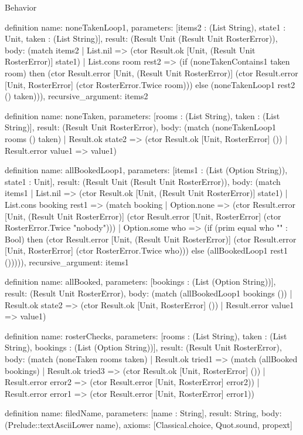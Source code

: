 \begin{lexlean}{Behavior}
\begin{semanticmodule}
definition{
  name: noneTakenLoop1,
  parameters: [items2 : (List String), state1 : Unit, taken : (List String)],
  result: (Result Unit (Result Unit RosterError)),
  body: (match items2
    | List.nil => (ctor Result.ok [Unit, (Result Unit RosterError)] state1)
    | List.cons room rest2 => (if (noneTakenContains1 taken room) then (ctor Result.error [Unit, (Result Unit RosterError)] (ctor Result.error [Unit, RosterError] (ctor RosterError.Twice room))) else (noneTakenLoop1 rest2 () taken))),
  recursive_argument: items2
}

definition{
  name: noneTaken,
  parameters: [rooms : (List String), taken : (List String)],
  result: (Result Unit RosterError),
  body: (match (noneTakenLoop1 rooms () taken)
    | Result.ok state2 => (ctor Result.ok [Unit, RosterError] ())
    | Result.error value1 => value1)
}

definition{
  name: allBookedLoop1,
  parameters: [items1 : (List (Option String)), state1 : Unit],
  result: (Result Unit (Result Unit RosterError)),
  body: (match items1
    | List.nil => (ctor Result.ok [Unit, (Result Unit RosterError)] state1)
    | List.cons booking rest1 => (match booking
      | Option.none => (ctor Result.error [Unit, (Result Unit RosterError)] (ctor Result.error [Unit, RosterError] (ctor RosterError.Twice "nobody")))
      | Option.some who => (if (prim equal who "" : Bool) then (ctor Result.error [Unit, (Result Unit RosterError)] (ctor Result.error [Unit, RosterError] (ctor RosterError.Twice who))) else (allBookedLoop1 rest1 ())))),
  recursive_argument: items1
}

definition{
  name: allBooked,
  parameters: [bookings : (List (Option String))],
  result: (Result Unit RosterError),
  body: (match (allBookedLoop1 bookings ())
    | Result.ok state2 => (ctor Result.ok [Unit, RosterError] ())
    | Result.error value1 => value1)
}

definition{
  name: rosterChecks,
  parameters: [rooms : (List String), taken : (List String), bookings : (List (Option String))],
  result: (Result Unit RosterError),
  body: (match (noneTaken rooms taken)
    | Result.ok tried1 => (match (allBooked bookings)
      | Result.ok tried3 => (ctor Result.ok [Unit, RosterError] ())
      | Result.error error2 => (ctor Result.error [Unit, RosterError] error2))
    | Result.error error1 => (ctor Result.error [Unit, RosterError] error1))
}

definition{
  name: filedName,
  parameters: [name : String],
  result: String,
  body: (Prelude::textAsciiLower name),
  axioms: [Classical.choice, Quot.sound, propext]
}


\end{semanticmodule}
\end{lexlean}
